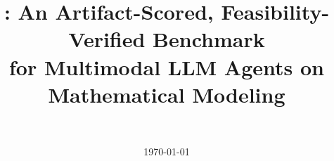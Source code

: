 \documentclass[11pt]{article}
\title{\bench{}: An Artifact-Scored, Feasibility-Verified Benchmark\\
for Multimodal LLM Agents on Mathematical Modeling}
\author{\todo{authors}\\
\todo{affiliations}}
\date{\today}
\begin{document}
\maketitle

\begin{abstract}

\end{abstract}
















\appendix








\end{document}
